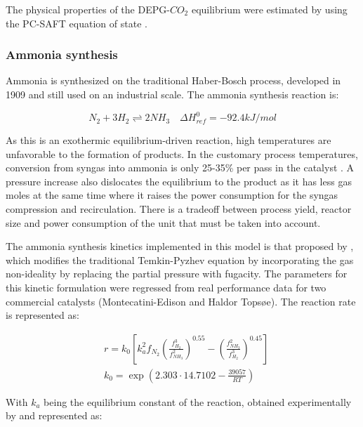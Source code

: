 \documentclass[a4paper, titlepage]{article}
\begin{document}
The physical properties of the DEPG-$CO_2$ equilibrium were estimated by using the PC-SAFT equation of state
\cite{dymentAcidGasCleaning2015}.

\subsubsection{Ammonia synthesis}

Ammonia is synthesized on the traditional Haber-Bosch process, developed in 1909 and still used on an industrial scale.
The ammonia synthesis reaction is:

\begin{equation}
	N_2 + 3H_2 \rightleftharpoons 2NH_3 \quad \Delta H_{ref}^0 = -92.4 kJ/mol
\end{equation}

As this is an exothermic equilibrium-driven reaction, high temperatures are unfavorable to the formation of products.
In the customary process temperatures, conversion from syngas into ammonia is only 25-35\% per pass in the catalyst
\cite{applAmmoniaPrinciplesIndustrial1999}. A pressure increase also dislocates the equilibrium to the product as it 
has less gas moles \cite{sandlerChemicalBiochemicalEngineering2017} at the same time where it raises the power 
consumption for the syngas compression and recirculation. There is a tradeoff between process yield, reactor size and 
power consumption of the unit that must be taken into account.

The ammonia synthesis kinetics implemented in this model is that proposed by 
\textcite{singhSimulationAmmoniaSynthesis1979}, which modifies the traditional Temkin-Pyzhev equation 
\cite{temkinKineticsAmmoniaSynthesis1940} by incorporating the gas non-ideality by replacing the partial pressure 
with fugacity. The parameters for this kinetic formulation were regressed from real performance data for two 
commercial catalysts (Montecatini-Edison and Haldor Topsøe). The reaction rate is represented as:

\begin{align}
	&r = k_0 \left[ k_a^2f_{N_2} \left(  \frac{f^3_{H_2}}{f^2_{NH_3}} \right)^{0.55} - \left( \frac{f^2_{NH_3}}{f^3_{H_2}} \right)^{0.45} \right] \\
	&k_0 = \exp \left(2.303 \cdot 14.7102 - \frac{39057}{RT}\right)
\end{align}

With $k_a$ being the equilibrium constant of the reaction, obtained experimentally by 
\textcite{gillespieThermodynamicTreatmentChemical1930} and represented as:
\end{document}
